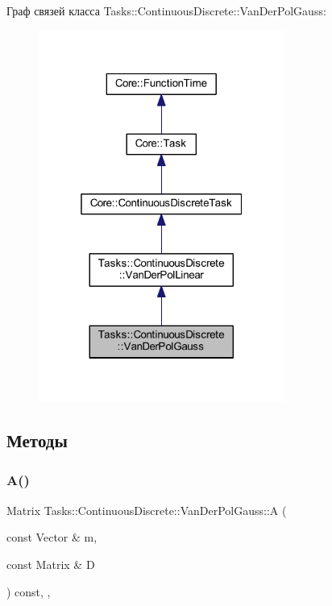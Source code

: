 Граф связей класса Tasks\+:\+:Continuous\+Discrete\+:\+:Van\+Der\+Pol\+Gauss\+:
\nopagebreak
\begin{figure}[H]
\begin{center}
\leavevmode
\includegraphics[width=229pt]{class_tasks_1_1_continuous_discrete_1_1_van_der_pol_gauss__coll__graph}
\end{center}
\end{figure}


\subsection{Методы}
\hypertarget{class_tasks_1_1_continuous_discrete_1_1_van_der_pol_gauss_acb431d1a24b276610f6b7c7ff343fb9f}{}\label{class_tasks_1_1_continuous_discrete_1_1_van_der_pol_gauss_acb431d1a24b276610f6b7c7ff343fb9f} 
\subsubsection{\texorpdfstring{A()}{A()}}
{\footnotesize\ttfamily Matrix Tasks\+::\+Continuous\+Discrete\+::\+Van\+Der\+Pol\+Gauss\+::A (\begin{DoxyParamCaption}\item[{const Vector \&}]{m,  }\item[{const Matrix \&}]{D }\end{DoxyParamCaption}) const\hspace{0.3cm}{\ttfamily [override]}, {\ttfamily [protected]}, {\ttfamily [virtual]}}



